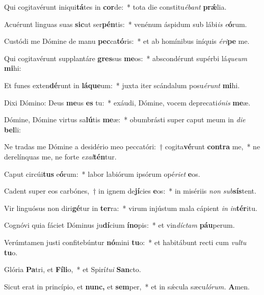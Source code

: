 \item Qui cogitavérunt iniqui\textbf{tá}tes in \textbf{cor}de:~* tota die constitu\tinyhspace\textit{ébant} \textbf{prǽ}lia.
\item Acuérunt linguas suas \textbf{sic}ut ser\textbf{pén}tis:~* venénum áspidum sub lábi\textit{is} \textit{e}\textbf{ó}rum.
\item Custódi me Dómine de manu \textbf{pec}ca\textbf{tó}ris:~* et ab homínibus iníquis \textit{éri}\textbf{pe} me.
\item Qui cogitavérunt supplantáre \textbf{gres}sus \textbf{me}os:~* abscondérunt supérbi lá\tinyhspace\textit{queum} \textbf{mi}hi:
\item Et funes exten\textbf{dé}runt in \textbf{lá}\textbf{que}um:~* juxta iter scándalum posu\tinyhspace\textit{érunt} \textbf{mi}hi.
\item Dixi Dómino: Deus \textbf{me}us \textbf{es} tu:~* exáudi, Dómine, vocem deprecati\textit{ónis} \textbf{me}æ.
\item Dómine, Dómine virtus sa\textbf{lú}tis \textbf{me}æ:~* obumbrásti super caput meum in \textit{die} \textbf{bel}li:
\item Ne tradas me Dómine a desidério meo peccatóri:~† cogita\textbf{vé}runt \textbf{con}\textbf{tra} me,~* ne derelínquas me, ne forte \textit{exal}\textbf{tén}tur.
\item Caput circúi\textbf{tus} e\textbf{ó}rum:~* labor labiórum ipsórum opé\textit{riet} \textbf{e}os.
\item Cadent super eos carbónes,~† in ignem de\textbf{jí}cies \textbf{e}os:~* in misériis \textit{non} \textit{sub}\textbf{sís}tent.
\item Vir linguósus non diri\textbf{gé}tur in \textbf{ter}ra:~* virum injústum mala cápient \textit{in} \textit{in}\textbf{tér}itu.
\item Cognóvi quia fáciet Dóminus ju\textbf{dí}cium \textbf{ín}\textbf{o}pis:~* et vin\textit{díctam} \textbf{páu}perum.
\item Verúmtamen justi confitebúntur \textbf{nó}mini \textbf{tu}o:~* et habitábunt re\-cti cum \textit{vultu} \textbf{tu}o.
\item Glória \textbf{Pa}tri, et \textbf{Fí}\textbf{li}o,~* et Spirí\tinyhspace\textit{tui} \textbf{San}cto.
\item Sicut erat in princípio, et \textbf{nunc,} et \textbf{sem}per,~* et in sǽcula sæcu\tinyhspace\textit{lórum.} \textbf{A}men.